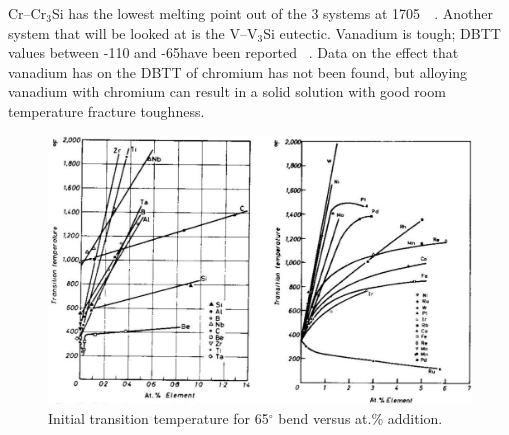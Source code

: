 Cr--Cr$_3$Si has the lowest melting point out of the 3 systems at 1705\celsius\ ~\cite{gokhale90}. Another system that will be looked at is the V--V$_3$Si eutectic. Vanadium is tough; DBTT values between -110 and -65\celsius have been reported ~\cite{dunn61}. Data on the effect that vanadium has on the DBTT of chromium has not been found, but alloying vanadium with chromium can result in a solid solution with good room temperature fracture toughness. 
%
\begin{figure}[H]
\begin{center}
\includegraphics{Cr_ductility}
\caption{Initial transition temperature for 65$^\circ$ bend versus at.\% addition.}
\label{fig:Cr_ductility}
\end{center}
\end{figure}
%
